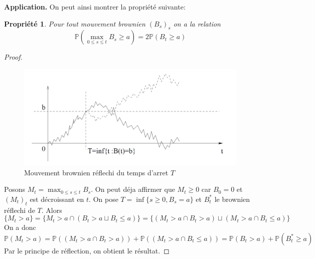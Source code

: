 \documentclass[a4paper]{article}
\newtheorem{propriete}{Propriété}[theorem]
\newtheorem{proof}{Démonstration}
\begin{document}
\textbf{Application.} On peut ainsi montrer la propriété suivante:
\begin{propriete}
    Pour tout mouvement brownien $(B_s)_s$ on a la relation
    \begin{equation*}
        \mathbb{P}(\max_{0\leq s \leq t} B_s \geq a) = 2 \mathbb{P}(B_t \geq a)
\end{equation*}
\end{propriete}
\begin{proof}
    \begin{figure}
    \centering
    \includegraphics[scale=0.5]{figures/reflection principle.png}
    \caption{Mouvement brownien réflechi du temps d'arret $T$}
    \label{fig:enter-label}
\end{figure}
Posons $M_t = \max_{0\leq s \leq t} B_s$. On peut déja affirmer que $M_t \geq 0$ car $B_0 = 0$ et $(M_t)_t$ est décroissant en $t$.
On pose $T = \inf\{s\geq 0 , B_s=a\}$  et $B_t^*$ le brownien réflechi de $T$. Alors
\begin{equation*}
    \{M_t > a\} = \{ M_t > a \cap ( B_t > a \sqcup B_t \leq a )\} =
    \{ (M_t > a \cap B_t > a) \sqcup (M_t > a \cap B_t \leq a) \}
\end{equation*}
On a donc 
\begin{equation*}
    \mathbb{P}(M_t > a) = \mathbb{P}((M_t > a \cap B_t > a)) + \mathbb{P}((M_t > a \cap B_t \leq a)) = \mathbb{P}(B_t > a) + \mathbb{P}(B_t^* \geq a)
\end{equation*}
Par le principe de réflection, on obtient le résultat.

\end{proof}
\end{document}
